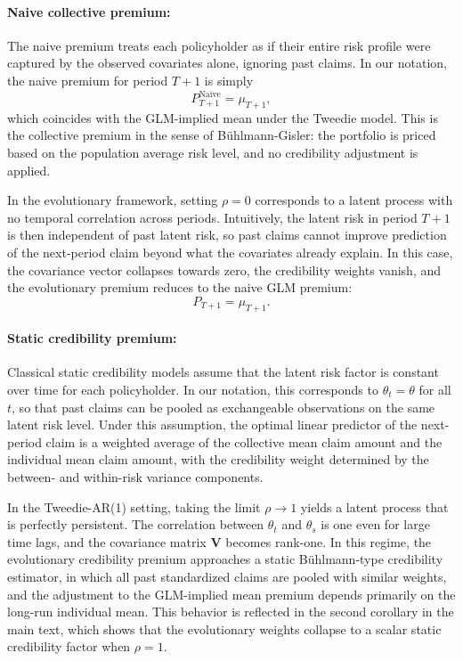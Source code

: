 \documentclass{sfuthesis}
\numberwithin{equation}{chapter}
\begin{document}
\paragraph{Naive collective premium:}
The naive premium treats each policyholder as if their entire risk profile
were captured by the observed covariates alone, ignoring past claims. In our
notation, the naive premium for period \(T+1\) is simply
\[
P^{\text{Naive}}_{T+1}
= \mu_{T+1},
\]
which coincides with the GLM-implied mean under the Tweedie model. This is
the collective premium in the sense of B{\"u}hlmann-Gisler: the portfolio is
priced based on the population average risk level, and no credibility
adjustment is applied.

In the evolutionary framework, setting \(\rho = 0\) corresponds to a latent
process with no temporal correlation across periods. Intuitively, the latent
risk in period \(T+1\) is then independent of past latent risk, so past claims
cannot improve prediction of the next-period claim beyond what the covariates
already explain. In this case, the covariance vector collapses
towards zero, the credibility weights vanish, and the
evolutionary premium reduces to the naive GLM premium:
\[
P_{T+1} = \mu_{T+1}.
\]


\paragraph{Static credibility premium:}
Classical static credibility models assume that the latent risk factor is
constant over time for each policyholder. In our notation, this corresponds
to \(\theta_t = \theta\) for all \(t\), so that past claims can be pooled as
exchangeable observations on the same latent risk level. Under this assumption,
the optimal linear predictor of the next-period claim is a weighted average of
the collective mean claim amount and the individual mean claim amount, with the credibility weight
determined by the between- and within-risk variance components.

In the Tweedie-AR(1) setting, taking the limit \(\rho \to 1\) yields a latent
process that is perfectly persistent. The correlation between
\(\theta_t\) and \(\theta_s\) is one even for large time lags,
and the covariance matrix \(\mathbf{V}\) becomes rank-one. In this
regime, the evolutionary credibility premium approaches a static B{\"u}hlmann-type
credibility estimator, in which all past standardized claims are pooled with
similar weights, and the adjustment to the GLM-implied mean premium depends primarily on
the long-run individual mean. This behavior is reflected in the second
corollary in the main text, which shows that the evolutionary weights collapse
to a scalar static credibility factor when \(\rho = 1\).
\end{document}
